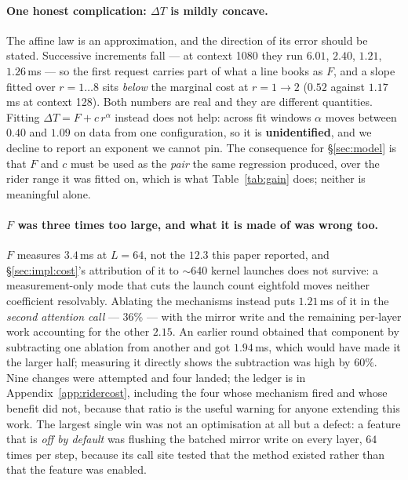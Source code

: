 \paragraph{One honest complication: $\Delta T$ is mildly concave.}
The affine law is an approximation, and the direction of its error should be stated.
Successive increments fall --- at context 1080 they run $6.01$, $2.40$, $1.21$,
$1.26$\,ms --- so the first request carries part of what a line books as $F$, and a
slope fitted over $r = 1\ldots8$ sits \emph{below} the marginal cost at
$r = 1 \to 2$ ($0.52$ against $1.17$\,ms at context 128). Both numbers are real and
they are different quantities. Fitting $\Delta T = F + c\,r^{\alpha}$ instead does
not help: across fit windows $\alpha$ moves between $0.40$ and $1.09$ on data from
one configuration, so it is \textbf{unidentified}, and we decline to report an
exponent we cannot pin. The consequence for \S\ref{sec:model} is that $F$ and $c$
must be used as the \emph{pair} the same regression produced, over the rider range
it was fitted on, which is what Table~\ref{tab:gain} does; neither is meaningful
alone.

\paragraph{$F$ was three times too large, and what it is made of was wrong too.}
$F$ measures $3.4$\,ms at $L = 64$, not the $12.3$ this paper reported, and
\S\ref{sec:impl:cost}'s attribution of it to $\sim$640 kernel launches does not
survive: a measurement-only mode that cuts the launch count eightfold moves neither
coefficient resolvably. Ablating the mechanisms instead puts $1.21$\,ms of it in
the \emph{second attention call} --- $36\%$ --- with the mirror write and the
remaining per-layer work accounting for the other $2.15$. An earlier round obtained
that component by subtracting one ablation from another and got $1.94$\,ms, which
would have made it the larger half; measuring it directly shows the subtraction was
high by $60\%$. Nine changes were attempted and four
landed; the ledger is in Appendix~\ref{app:ridercost}, including the four whose
mechanism fired and whose benefit did not, because that ratio is the useful warning
for anyone extending this work. The largest single win was not an optimisation at
all but a defect: a feature that is \emph{off by default} was flushing the batched
mirror write on every layer, $64$ times per step, because its call site tested that
the method existed rather than that the feature was enabled.

